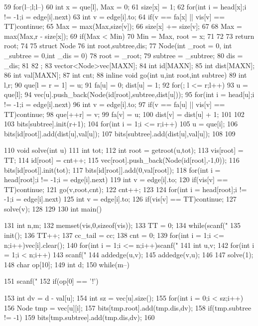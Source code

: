 \documentclass[11pt]{article}
\begin{document}
\begin{Code}
{ 59       for(l--;l;l--){
 60           int x = que[l], Max = 0;
 61           size[x] = 1;
 62           for(int i = head[x];i != -1;i = edge[i].next){
 63               int v = edge[i].to;
 64               if(v == fa[x] || vis[v] == TT)continue;
 65               Max = max(Max,size[v]);
 66               size[x] += size[v];
 67           }
 68           Max = max(Max,r - size[x]);
 69           if(Max < Min){
 70               Min = Max, root = x;
 71           }
 72       }
 73       return root;
 74   }
 75   struct Node{
 76       int root,subtree,dis;
 77       Node(int _root = 0, int _subtree = 0,int _dis = 0){
 78           root = _root;
 79           subtree = _subtree;
 80           dis = _dis;
 81       }
 82   };
 83   vector<Node>vec[MAXN];
 84   int id[MAXN];
 85   int dist[MAXN];
 86   int val[MAXN];
 87   int cnt;
 88   inline void go(int u,int root,int subtree){
 89       int l,r;
 90       que[l = r = 1] = u;
 91       fa[u] = 0; dist[u] = 1;
 92       for(; l <= r;l++){
 93           u = que[l];
 94           vec[u].push_back(Node(id[root],subtree,dist[u]));
 95           for(int i = head[u];i != -1;i = edge[i].next){
 96                int v = edge[i].to;
 97                if(v == fa[u] || vis[v] == TT)continue;
 98                que[++r] = v;
 99                fa[v] = u;
100                dist[v] = dist[u] + 1;
101           }
102       }
103       bits[subtree].init(r+1);
104       for(int i = 1;i <= r;i++){
105           u = que[i];
106           bits[id[root]].add(dist[u],val[u]);
107           bits[subtree].add(dist[u],val[u]);
108       }
109   }


110 void solve(int u){
111     int tot;
112     int root = getroot(u,tot);
113     vis[root] = TT;
114     id[root] = cnt++;
115     vec[root].push_back(Node(id[root],-1,0));
116     bits[id[root]].init(tot);
117     bits[id[root]].add(0,val[root]);
118     for(int i = head[root];i != -1;i = edge[i].next){
119         int v = edge[i].to;
120         if(vis[v] == TT)continue;
121         go(v,root,cnt);
122         cnt++;
123     }
124     for(int i = head[root];i != -1;i = edge[i].next){
125         int v = edge[i].to;
126         if(vis[v] == TT)continue;
127         solve(v);
128     }
129 }
130 int main(){
131     int n,m;
132     memset(vis,0,sizeof(vis));
133     TT = 0;
134     while(scanf("%
135         init();
136         TT++;
137         cc_tail = cc;
138         cnt = 0;
139         for(int i = 1;i <= n;i++)vec[i].clear();
140         for(int i = 1;i <= n;i++)scanf("%
141         int u,v;
142         for(int i = 1;i < n;i++){
143              scanf("%
144              addedge(u,v);
145              addedge(v,u);
146         }
147         solve(1);
148         char op[10];
149         int d;
150         while(m--){
151              scanf("%
152              if(op[0] == '!'){
153                  int dv = d - val[u];
154                  int sz = vec[u].size();
155                  for(int i = 0;i < sz;i++){
156                      Node tmp = vec[u][i];
157                      bits[tmp.root].add(tmp.dis,dv);
158                      if(tmp.subtree != -1)
159                          bits[tmp.subtree].add(tmp.dis,dv);
160                  }


}}}
\end{Code}
\end{document}
